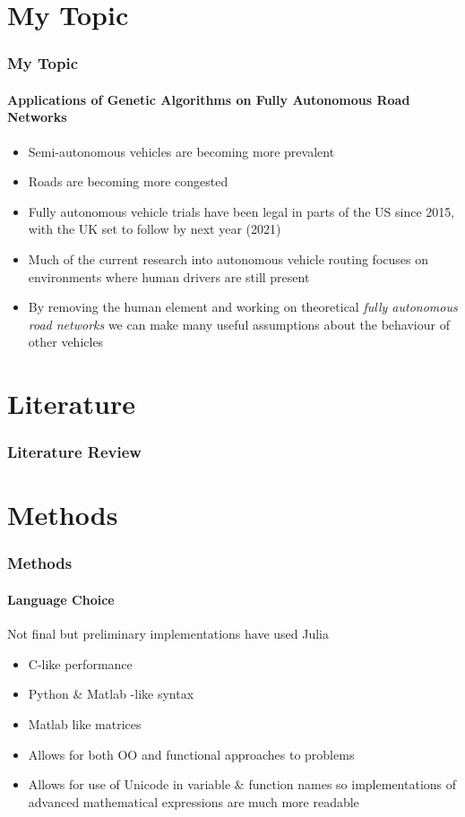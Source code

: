 \documentclass{beamer}
\author{Sam Barrett, 1803086}
\title{{Master's Project Presentation} \\ \texorpdfstring
        {\texttt{[image: uobcrest.jpg]}}
    }
\institute{{University of Birmingham}}
\date{\today}
\begin{document}
\begin{frame}
\titlepage
\end{frame}


\section{My Topic}
\begin{frame}
    \frametitle{My Topic}
    \framesubtitle{Applications of Genetic Algorithms on Fully Autonomous Road Networks}

    \begin{itemize}

        \item Semi-autonomous vehicles are becoming more prevalent 
        \item Roads are becoming more congested
        \item Fully autonomous vehicle trials have been legal in parts of the US since 2015\cite{AutonomousVehiclesSelfDriving}, with the UK set to follow by next year (2021)\cite{UKWantsFully2019}
        \item Much of the current research into autonomous vehicle routing focuses on environments where human drivers are still present
        \item By removing the human element and working on theoretical \textit{fully autonomous road networks} we can make many useful assumptions about the behaviour of other vehicles

    \end{itemize}
\end{frame}


\section{Literature}
\begin{frame}
    \frametitle{Literature Review}
\end{frame}


\section{Methods}
\begin{frame}
    \frametitle{Methods}
    \framesubtitle{Language Choice} 
    Not final but preliminary implementations have used Julia\cite{JuliaProgrammingLanguage}
    \begin{itemize}
        \item C-like performance
        \item Python \& Matlab -like syntax
        \item Matlab like matrices 
        \item Allows for both OO and functional approaches to problems
        \item Allows for use of Unicode in variable \& function names so implementations of advanced mathematical expressions are much more readable
    \end{itemize}
\end{frame}
\end{document}
